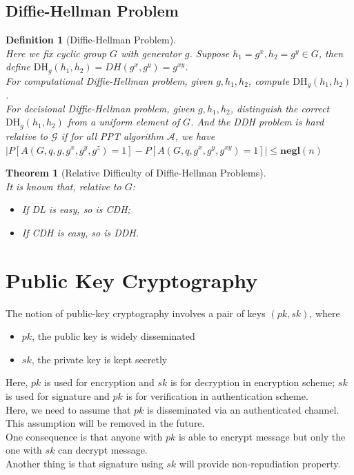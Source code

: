 \documentclass[12pt]{article}
\newtheorem{definition}{Definition}[section]
\newtheorem{theorem}{Theorem}[section]
\theoremstyle{definition}
\begin{document}
\subsection{Diffie-Hellman Problem}
\begin{definition}[Diffie-Hellman Problem]
\hfill\\\normalfont Here we fix cyclic group $G$ with generator $g$. Suppose $h_1 = g^x,h_2=g^y\in G$, then define $\text{DH}_g(h_1,h_2)=DH(g^x,g^y)=g^{xy}$.\\
For \textit{computational} Diffie-Hellman problem, given $g,h_1,h_2$, compute $\text{DH}_g(h_1,h_2)$.\\
For \textit{decisional} Diffie-Hellman problem, given $g,h_1,h_2$, distinguish the correct $\text{DH}_g(h_1, h_2)$ from a uniform element of $G$. And the DDH problem is hard relative to $\mathcal{G}$ if for all PPT algorithm $\mathcal{A}$, we have
$
|P[A(G,q,g,g^x,g^y,g^z)=1]-P[A(G,q,g^x,g^y,g^{xy})=1]|\leq \mathbf{negl}(n)
$
\end{definition}
\begin{theorem}[Relative Difficulty of Diffie-Hellman Problems]
\hfill\\\normalfont It is known that, relative to $G$:
\begin{itemize}
  \item If DL is easy, so is CDH;
  \item If CDH is easy, so is DDH.
\end{itemize}
\end{theorem}

\section{Public Key Cryptography}
The notion of public-key cryptography involves a pair of keys $(pk, sk)$, where
\begin{itemize}
  \item $pk$, the public key is widely disseminated
  \item $sk$, the private key is kept secretly
\end{itemize}
Here, $pk$ is used for encryption and $sk$ is for decryption in encryption scheme; $sk$ is used for signature and $pk$ is for verification in authentication scheme.\\
Here, we need to assume that $pk$ is disseminated via an authenticated channel. This assumption will be removed in the future.\\
One consequence is that anyone with $pk$ is able to encrypt message but only the one with $sk$ can decrypt message.\\
Another thing is that signature using $sk$ will provide non-repudiation property.
\end{document}
